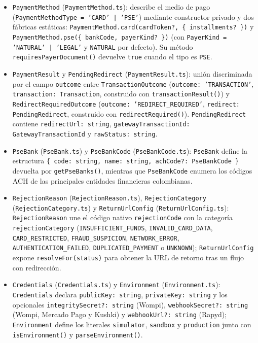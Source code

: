 \begin{itemize}
  \item \texttt{PaymentMethod} (\texttt{PaymentMethod.ts}): describe el medio de pago (\texttt{PaymentMethodType = 'CARD' | 'PSE'}) mediante constructor privado y dos fábricas estáticas: \texttt{PaymentMethod.\allowbreak{}card(\allowbreak{}cardToken?, \{ installments? \})} y \texttt{PaymentMethod.pse(\allowbreak{}\{ bankCode, payerKind? \})} (con \texttt{PayerKind = 'NATURAL' | 'LEGAL'} y \texttt{NATURAL} por defecto). Su método \texttt{requiresPayerDocument()} devuelve \texttt{true} cuando el tipo es \texttt{PSE}.
  \item \texttt{PaymentResult} y \texttt{PendingRedirect} (\texttt{PaymentResult.ts}): unión discriminada por el campo \texttt{outcome} entre \texttt{TransactionOutcome} (\texttt{outcome: 'TRANSACTION'}, \texttt{transaction: Transaction}, construido con \texttt{transactionResult()}) y \texttt{RedirectRequiredOutcome} (\texttt{outcome: 'REDIRECT\_REQUIRED'}, \texttt{redirect: PendingRedirect}, construido con \texttt{redirectRequired()}). \texttt{PendingRedirect} contiene \texttt{redirectUrl: string}, \texttt{gatewayTransactionId: GatewayTransactionId} y \texttt{rawStatus: string}.
  \item \texttt{PseBank} (\texttt{PseBank.ts}) y \texttt{PseBankCode} (\texttt{PseBankCode.ts}): \texttt{PseBank} define la estructura \texttt{\{ code: string, name: string, achCode?: PseBankCode \}} devuelta por \texttt{getPseBanks()}, mientras que \texttt{PseBankCode} enumera los códigos ACH de las principales entidades financieras colombianas.
  \item \texttt{Rejection\allowbreak{}Reason} (\texttt{Rejection\allowbreak{}Reason.ts}), \texttt{Rejection\allowbreak{}Category} (\texttt{Rejection\allowbreak{}Category.ts}) y \texttt{Return\allowbreak{}Url\allowbreak{}Config} (\texttt{Return\allowbreak{}Url\allowbreak{}Config.ts}): \texttt{Rejection\allowbreak{}Reason} une el código nativo \texttt{rejectionCode} con la categoría \texttt{rejection\allowbreak{}Category} (\texttt{INSUFFICIENT\_\allowbreak{}FUNDS}, \texttt{INVALID\_\allowbreak{}CARD\_\allowbreak{}DATA}, \texttt{CARD\_\allowbreak{}RESTRICTED}, \texttt{FRAUD\_\allowbreak{}SUSPICION}, \texttt{NETWORK\_\allowbreak{}ERROR}, \texttt{AUTHENTICATION\_\allowbreak{}FAILED}, \texttt{DUPLICATED\_\allowbreak{}PAYMENT} o \texttt{UNKNOWN}); \texttt{Return\allowbreak{}Url\allowbreak{}Config} expone \texttt{resolveFor(\allowbreak{}status)} para obtener la URL de retorno tras un flujo con redirección.
  \item \texttt{Credentials} (\texttt{Credentials.ts}) y \texttt{Environment} (\texttt{Environment.ts}): \texttt{Credentials} declara \texttt{publicKey: string}, \texttt{privateKey: string} y los opcionales \texttt{integritySecret?: string} (Wompi), \texttt{webhookSecret?: string} (Wompi, Mercado Pago y Kushki) y \texttt{webhookUrl?: string} (Rapyd); \texttt{Environment} define los literales \texttt{simulator}, \texttt{sandbox} y \texttt{production} junto con \texttt{isEnvironment()} y \texttt{parseEnvironment()}.

\end{itemize}
